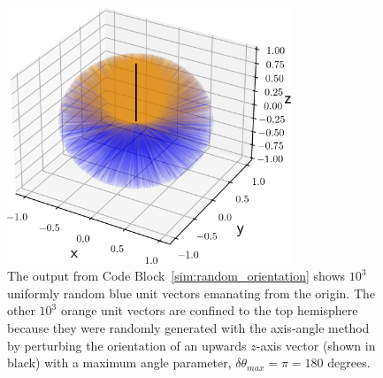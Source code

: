 \documentclass[
  9pt,
  bestpractices,
  pubversion,
]{livecoms}
\begin{document}
\begin{figure}

\end{figure}

\begin{figure}

\end{figure}

\begin{figure}

\end{figure}

\begin{figure}
\begin{centering}
\includegraphics[width=8.5cm]{../figures/random_orientation.png}
\caption{
The output from Code Block~\ref{sim:random_orientation} shows $10^3$ uniformly random blue unit vectors emanating from the origin.
The other $10^3$ orange unit vectors are confined to the top hemisphere because they were randomly generated with the axis-angle method by perturbing the orientation of an upwards $z$-axis vector (shown in black) with a maximum angle parameter, $\delta \theta_{max}=\pi=180$ degrees.
\label{fig:random_orientation}
}
\end{centering}
\end{figure}
\end{document}
